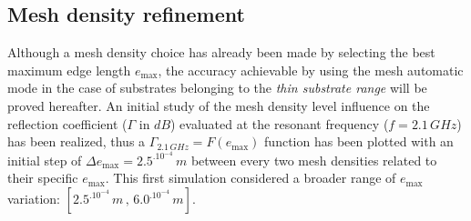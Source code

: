 \documentclass[10 pt,a4paper,twocolumn]{article}
\begin{document}
{\subsection*{Mesh density refinement}
Although a mesh density choice has already been made by selecting the best maximum edge length $e_{\max}$, the accuracy achievable by using the mesh automatic mode in the case of substrates belonging to the  \emph{thin substrate range} will be proved hereafter. An initial study of the mesh density level influence on the reflection coefficient ($\Gamma$ in $dB$) evaluated at the resonant frequency ($f=2.1\,GHz$) has been realized, thus a  $\Gamma_{2.1\,GHz}=F(e_{\max})$ function has been plotted with an initial step of $\Delta e_{\max} = 2.5^.10^{-4}\,m$ between every two mesh densities related to their specific $e_{\max}$. This first simulation considered a broader range of $e_{\max}$ variation: $[2.5^.10^{-4}\,m\,,\,6.0^.10^{-4}\,m]$. 

\indent 

}
\end{document}
